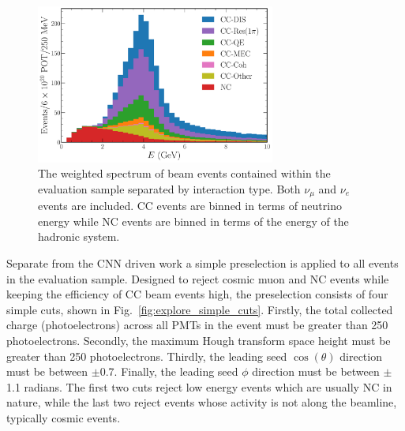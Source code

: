 \begin{figure} %
    \includegraphics[width=0.7\textwidth]{diagrams/6-cvn/chipsnet/explore_stacked_int_types.pdf}
    \caption[Weighted spectrum of interaction types within the evaluation sample.]
    {The weighted spectrum of beam events contained within the evaluation sample separated by
        interaction type. Both $\nu_{\mu}$ and $\nu_{e}$ events are included. CC events are binned
        in terms of neutrino energy while NC events are binned in terms of the energy of the
        hadronic system.}
    \label{fig:explore_stacked_int_types}
\end{figure}

Separate from the CNN driven work a simple preselection is applied to all events in the evaluation
sample. Designed to reject cosmic muon and NC events while keeping the efficiency of CC beam
events high, the preselection consists of four simple cuts, shown in
Fig.~\ref{fig:explore_simple_cuts}. Firstly, the total collected charge (photoelectrons) across
all PMTs in the event must be greater than 250 photoelectrons. Secondly, the maximum Hough
transform space height must be greater than 250 photoelectrons. Thirdly, the leading seed
$\cos(\theta)$ direction must be between $\pm$0.7. Finally, the leading seed $\phi$ direction must
be between $\pm$1.1 radians. The first two cuts reject low energy events which are usually NC in
nature, while the last two reject events whose activity is not along the beamline, typically
cosmic events.

